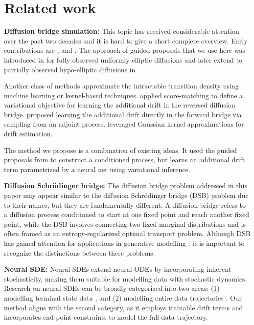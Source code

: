 \section{Related work}
\textbf{Diffusion bridge simulation:} 
This topic has received considerable attention over the past two decades and it is hard to give a short complete overview. Early contributions are \citet{clark1990simulation, chib2004likelihood, delyon2006simulation, beskos2006exact, lin2010generating}, and \citet{golightly2010learning}. The approach of guided proposals that we use here was introduced in \citet{schauer2017guided} for fully observed uniformly elliptic diffusions and later extend to partially observed hypo-elliptic diffusions in \citet{bierkens2020simulation}.

Another class of methods approximate the intractable transition density using machine learning or kernel-based techniques.  \citet{heng2022simulating} applied score-matching to define a variational objective for learning the additional drift in the reversed diffusion bridge. \citet{baker2024score} proposed learning the additional drift directly in the forward bridge via sampling from an adjoint process. \citet{chau2024efficient} leveraged Gaussian kernel approximations for drift estimation. 

The method we propose is a combination of existing ideas. It used the guided proposals from \citet{schauer2017guided} to construct a conditioned process, but learns an additional drift term parametrized by a neural net using variational inference. 

\textbf{Diffusion Schrödinger bridge:} The diffusion bridge problem addressed in this paper may appear similar to the diffusion Schrödinger bridge (DSB) problem due to their names, but they are fundamentally different. A diffusion bridge refers to a diffusion process conditioned to start at one fixed point and reach another fixed point, while the DSB involves connecting two fixed marginal distributions and is often framed as an entropy-regularized optimal transport problem. Although DSB has gained attention for applications in generative modelling \citep{thornton2022riemannian, de2021diffusion, shi2024diffusion, tang2024simplified}, it is important to recognize the distinctions between these problems.

\textbf{Neural SDE:} Neural SDEs extend neural ODEs \citep{chen2018neural} by incorporating inherent stochasticity, making them suitable for modelling data with stochastic dynamics. Research on neural SDEs can be broadly categorized into two areas: (1) modelling terminal state data \citep{tzen2019neural, tzen2019theoretical}, and (2) modelling entire data trajectories \citep{li2020scalable, kidger2021neural}. Our method aligns with the second category, as it employs trainable drift terms and incorporates end-point constraints to model the full data trajectory.